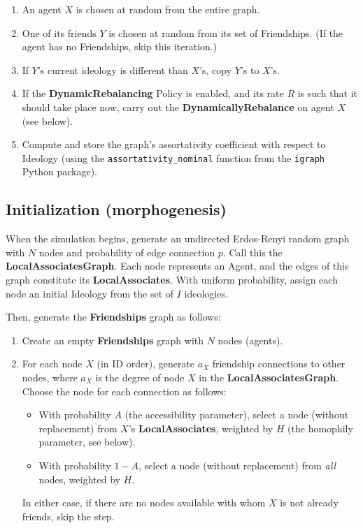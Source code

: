 \begin{enumerate}
\itemsep.1em
\item An agent $X$ is chosen at random from the entire graph.
\item One of its friends $Y$ is chosen at random from its set of Friendships.
(If the agent has no Friendships, skip this iteration.)
\item If $Y$'s current ideology is different than $X$'s, copy $Y$'s to $X$'s.
\item If the \textbf{DynamicRebalancing} Policy is enabled, and its rate $R$
is such that it should take place now, carry out the
\textbf{DynamicallyRebalance} on agent $X$ (see below).
 
\item Compute and store the graph's assortativity coefficient with respect to
Ideology (using the \texttt{assortativity\_nominal} function from the
\texttt{igraph} Python package\cite{csardi_igraph_2006}). \end{enumerate}


\subsection{Initialization (morphogenesis)}
\label{sec:initialization}

When the simulation begins, generate an undirected Erdos-Renyi random
graph\cite{erdos_evolution_1960} with $N$ nodes and probability of edge
connection $p$. Call this the \textbf{LocalAssociatesGraph}. Each node
represents an Agent, and the edges of this graph constitute its
\textbf{LocalAssociates}. With uniform probability, assign each node an
initial Ideology from the set of $I$ ideologies.

Then, generate the \textbf{Friendships} graph as follows:

\begin{enumerate}
\item Create an empty \textbf{Friendships} graph with $N$ nodes (agents).
\item For each node $X$ (in ID order), generate $a_X$ friendship connections
to other nodes, where $a_X$ is the degree of node $X$ in the
\textbf{LocalAssociatesGraph}. Choose the node for each connection as follows:
    \begin{itemize}
    \item With probability $A$ (the accessibility parameter), select a node
(without replacement) from $X$'s \textbf{LocalAssociates}, weighted by $H$
(the homophily parameter, see below).
    \item With probability $1-A$, select a node (without replacement) from
\textit{all} nodes, weighted by $H$.
    \end{itemize}
    In either case, if there are no nodes available with whom $X$ is not
already friends, skip the step.
\end{enumerate}

